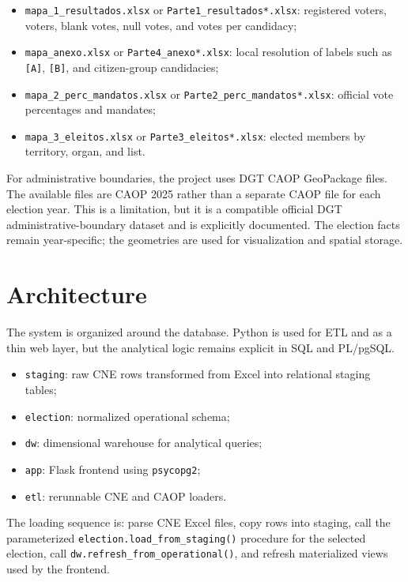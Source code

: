 \documentclass[11pt,twocolumn]{article}
\begin{document}
\begin{itemize}
  \item \texttt{mapa\_1\_resultados.xlsx} or \texttt{Parte1\_resultados*.xlsx}: registered voters, voters, blank votes, null votes, and votes per candidacy;
  \item \texttt{mapa\_anexo.xlsx} or \texttt{Parte4\_anexo*.xlsx}: local resolution of labels such as \texttt{[A]}, \texttt{[B]}, and citizen-group candidacies;
  \item \texttt{mapa\_2\_perc\_mandatos.xlsx} or \texttt{Parte2\_perc\_mandatos*.xlsx}: official vote percentages and mandates;
  \item \texttt{mapa\_3\_eleitos.xlsx} or \texttt{Parte3\_eleitos*.xlsx}: elected members by territory, organ, and list.
\end{itemize}

For administrative boundaries, the project uses DGT CAOP GeoPackage files. The available files are CAOP 2025 rather than a separate CAOP file for each election year. This is a limitation, but it is a compatible official DGT administrative-boundary dataset and is explicitly documented. The election facts remain year-specific; the geometries are used for visualization and spatial storage.

\section{Architecture}

The system is organized around the database. Python is used for ETL and as a thin web layer, but the analytical logic remains explicit in SQL and PL/pgSQL.

\begin{itemize}
  \item \texttt{staging}: raw CNE rows transformed from Excel into relational staging tables;
  \item \texttt{election}: normalized operational schema;
  \item \texttt{dw}: dimensional warehouse for analytical queries;
  \item \texttt{app}: Flask frontend using \texttt{psycopg2};
  \item \texttt{etl}: rerunnable CNE and CAOP loaders.
\end{itemize}

The loading sequence is: parse CNE Excel files, copy rows into staging, call the parameterized \texttt{election.load\_from\_staging()} procedure for the selected election, call \texttt{dw.refresh\_from\_operational()}, and refresh materialized views used by the frontend.
\end{document}

